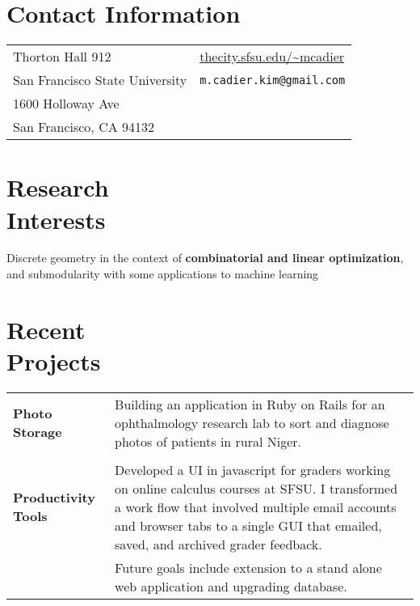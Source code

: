 \documentclass[margin,line,pifont,palatino,courier]{res}
\begin{document}

\begin{resume}

\section{\sc  Contact Information}

\vspace{.05in}
\begin{tabular}{@{}p{2.75in}p{2in}}
Thorton Hall 912     &  \url{thecity.sfsu.edu/~mcadier}  \\
     San Francisco State University    & \verb+m.cadier.kim@gmail.com+\\
      1600 Holloway Ave & \\
      San Francisco, CA 94132  & \\

\end{tabular}

 
\section{\sc  Research \\ Interests}


Discrete geometry in the context of {\bf combinatorial and linear optimization}, and submodularity with some applications to machine learning



\section{\sc Recent \\Projects}

\begin{tabular}{@{}p{0.75in}p{4.5in}}
{\bf Photo Storage } &
Building an application in Ruby on Rails for an ophthalmology research lab to sort and diagnose photos of patients in rural Niger. \\ \\

{\bf Productivity Tools} & 
Developed a UI in javascript for graders working on online calculus courses at SFSU.  I transformed a work flow that involved multiple email accounts and browser tabs to a single GUI that emailed, saved, and archived grader feedback. \\
&  Future goals include extension to a stand alone web application and upgrading database.


\end{tabular}
\end{resume}
\end{document}
